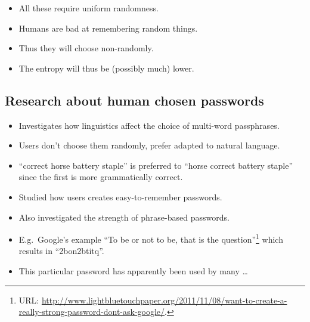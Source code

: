 \documentclass{beamer}
\begin{document}
\begin{frame}
  \begin{remark}
    \begin{itemize}
      \item All these require uniform randomness.
      \item Humans are bad at remembering random things.
      \item Thus they will choose non-randomly.
      \item The entropy will thus be (possibly much) lower.
    \end{itemize}
  \end{remark}
\end{frame}

\subsection{Research about human chosen passwords}

\begin{frame}
  \begin{example}
    \begin{itemize}
      \item Investigates how linguistics affect the choice of multi-word 
        passphrases.

      \item Users don't choose them randomly, prefer adapted to natural 
        language.

      \item \enquote{correct horse battery staple} is preferred to 
        \enquote{horse correct battery staple} since the first is more 
        grammatically correct.
    \end{itemize}
  \end{example}
\end{frame}

\begin{frame}
  \begin{example}
    \begin{itemize}
      \item Studied how users creates easy-to-remember passwords.

      \item Also investigated the strength of phrase-based passwords.

      \item E.g.\ Google's example \enquote{To be or not to be, that is the 
          question}\footnote{%
          URL\@: 
          \protect\url{http://www.lightbluetouchpaper.org/2011/11/08/want-to-create-a-really-strong-password-dont-ask-google/}.
        } which results in \enquote{2bon2btitq}.

      \item This particular password has apparently been used by many \dots
    \end{itemize}
  \end{example}
\end{frame}
\end{document}
